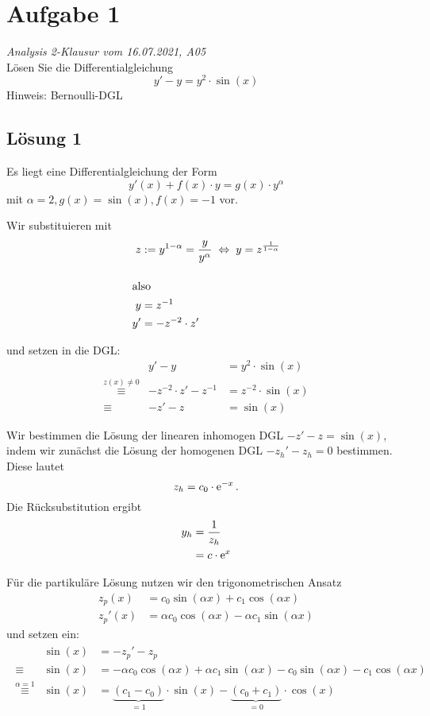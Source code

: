 \documentclass[main.tex]{subfiles}
\begin{document}
\section{Aufgabe 1}
\textit{Analysis 2-Klausur vom 16.07.2021, A05}\\
Lösen Sie die Differentialgleichung
\begin{equation*}
	y' - y = y^2 \cdot \sin(x)
\end{equation*}
Hinweis: Bernoulli-DGL

\subsection{Lösung 1}
Es liegt eine Differentialgleichung der Form
$$
	y'(x) + f(x)\cdot y = g(x)\cdot y^\alpha
$$
mit $\alpha = 2, g(x) = \sin(x), f(x) = -1$ vor. 

Wir substituieren mit
\begin{align*}
	z &:= y^{1-\alpha} = \frac{y}{y^\alpha} \;\equiv\; y=z^{\frac{1}{1-\alpha}}\\[4mm]
\intertext{also}
	y  &= z^{-1} \\
	y' &= -z^{-2}\cdot z'
\end{align*}

und setzen in die DGL:
\begin{equation*}
\begin{array}{crl}
				& y' - y &= y^2 \cdot \sin(x) \\[2mm]
\overset{z(x) \neq 0}{\equiv} & -z^{-2}\cdot z' - z^{-1} &= z^{-2}\cdot \sin(x) \\[2mm]
\equiv	& -z' - z &= \sin(x)
\end{array}
\end{equation*}

Wir bestimmen die Lösung der linearen inhomogen DGL $-z' - z = \sin(x)$, indem wir zunächst die Lösung der homogenen DGL $-z_h' - z_h = 0$ bestimmen.
Diese lautet
$$
	z_h = c_0 \cdot \e^{-x}. 
$$
Die Rücksubstitution ergibt
\begin{align*}
	y_h &= \frac{1}{z_h} \\
	    &= c \cdot \ct{e}^{x}
\end{align*}

Für die partikuläre Lösung nutzen wir den trigonometrischen Ansatz 
\begin{align*}
    z_p(x)   &= c_0 \sin(\alpha x) + c_1 \cos(\alpha x) \\
    z_p'(x)  &= \alpha c_0 \cos(\alpha x) - \alpha c_1 \sin(\alpha x)
\end{align*}
und setzen ein:
\begin{align*}
\begin{array}{crl}
				& \sin(x) &= -z_p' - z_p \\
\equiv & \sin(x) &= - \alpha c_0 \cos(\alpha x) + \alpha c_1 \sin(\alpha x)
							 - c_0 \sin(\alpha x) - c_1 \cos(\alpha x) \\
\overset{\alpha = 1}{\equiv} & \sin(x) &=
					  \underbrace{(c_1 - c_0)}_{= 1}\cdot \sin(x)
					- \underbrace{(c_0 + c_1)}_{= 0}\cdot \cos(x) \\
\end{array}
\end{align*}
\end{document}
